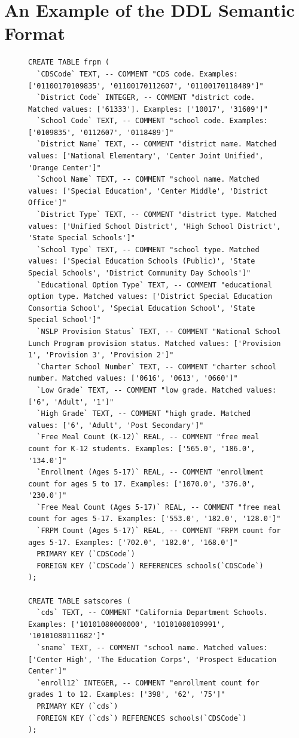 \section{An Example of the DDL Semantic Format}
\label{app:ddl}

\begin{figure}[!t]
\centering
\begin{lstlisting}
CREATE TABLE frpm (
  `CDSCode` TEXT, -- COMMENT "CDS code. Examples: ['01100170109835', '01100170112607', '01100170118489']"
  `District Code` INTEGER, -- COMMENT "district code. Matched values: ['61333']. Examples: ['10017', '31609']"
  `School Code` TEXT, -- COMMENT "school code. Examples: ['0109835', '0112607', '0118489']"
  `District Name` TEXT, -- COMMENT "district name. Matched values: ['National Elementary', 'Center Joint Unified', 'Orange Center']"
  `School Name` TEXT, -- COMMENT "school name. Matched values: ['Special Education', 'Center Middle', 'District Office']"
  `District Type` TEXT, -- COMMENT "district type. Matched values: ['Unified School District', 'High School District', 'State Special Schools']"
  `School Type` TEXT, -- COMMENT "school type. Matched values: ['Special Education Schools (Public)', 'State Special Schools', 'District Community Day Schools']"
  `Educational Option Type` TEXT, -- COMMENT "educational option type. Matched values: ['District Special Education Consortia School', 'Special Education School', 'State Special School']"
  `NSLP Provision Status` TEXT, -- COMMENT "National School Lunch Program provision status. Matched values: ['Provision 1', 'Provision 3', 'Provision 2']"
  `Charter School Number` TEXT, -- COMMENT "charter school number. Matched values: ['0616', '0613', '0660']"
  `Low Grade` TEXT, -- COMMENT "low grade. Matched values: ['6', 'Adult', '1']"
  `High Grade` TEXT, -- COMMENT "high grade. Matched values: ['6', 'Adult', 'Post Secondary']"
  `Free Meal Count (K-12)` REAL, -- COMMENT "free meal count for K-12 students. Examples: ['565.0', '186.0', '134.0']"
  `Enrollment (Ages 5-17)` REAL, -- COMMENT "enrollment count for ages 5 to 17. Examples: ['1070.0', '376.0', '230.0']"
  `Free Meal Count (Ages 5-17)` REAL, -- COMMENT "free meal count for ages 5-17. Examples: ['553.0', '182.0', '128.0']"
  `FRPM Count (Ages 5-17)` REAL, -- COMMENT "FRPM count for ages 5-17. Examples: ['702.0', '182.0', '168.0']"
  PRIMARY KEY (`CDSCode`)
  FOREIGN KEY (`CDSCode`) REFERENCES schools(`CDSCode`)
);

CREATE TABLE satscores (
  `cds` TEXT, -- COMMENT "California Department Schools. Examples: ['10101080000000', '10101080109991', '10101080111682']"
  `sname` TEXT, -- COMMENT "school name. Matched values: ['Center High', 'The Education Corps', 'Prospect Education Center']"
  `enroll12` INTEGER, -- COMMENT "enrollment count for grades 1 to 12. Examples: ['398', '62', '75']"
  PRIMARY KEY (`cds`)
  FOREIGN KEY (`cds`) REFERENCES schools(`CDSCode`)
);


\end{lstlisting}
\end{figure}
